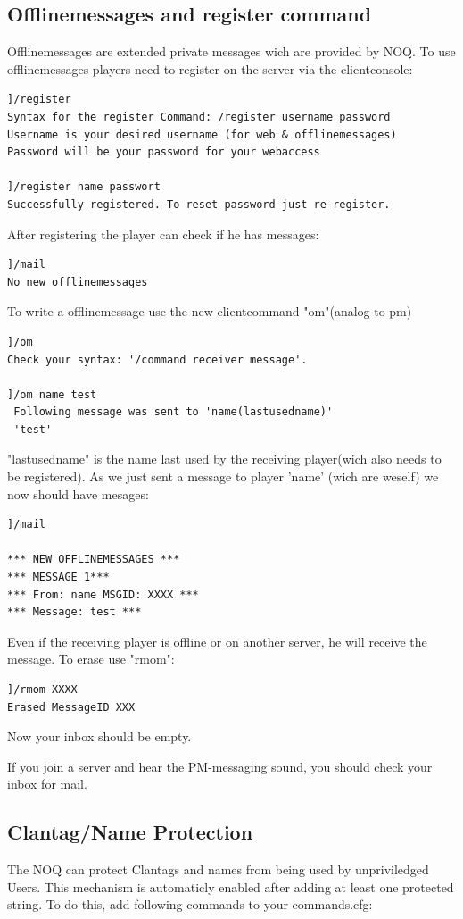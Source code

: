 \documentclass[12pt,a4paper]{article}
\begin{document}
\subsection{Offlinemessages and register command}
Offlinemessages are extended private messages wich are provided by NOQ.
To use offlinemessages players need to register on the server via the clientconsole:
\\
\begin{lstlisting}
]/register
Syntax for the register Command: /register username password
Username is your desired username (for web & offlinemessages)
Password will be your password for your webaccess

]/register name passwort
Successfully registered. To reset password just re-register.
\end{lstlisting}
After registering the player can check if he has messages:
\\
\begin{lstlisting}
]/mail
No new offlinemessages
\end{lstlisting}

To write a offlinemessage use the new clientcommand "om"(analog to pm)
\begin{lstlisting}
]/om
Check your syntax: '/command receiver message'.

]/om name test
 Following message was sent to 'name(lastusedname)'
 'test'
\end{lstlisting}
"lastusedname" is the name last used by the receiving player(wich also needs to be registered).
As we just sent a message to player 'name' (wich are weself) we now should have mesages:
\\
\begin{lstlisting}
]/mail

*** NEW OFFLINEMESSAGES ***
*** MESSAGE 1***
*** From: name MSGID: XXXX ***
*** Message: test ***
\end{lstlisting}
Even if the receiving player is offline or on another server, he will receive the message.
To erase use "rmom":
\\
\begin{lstlisting}
]/rmom XXXX
Erased MessageID XXX
\end{lstlisting}
Now your inbox should be empty.

If you join a server and hear the PM-messaging sound, you should check your inbox for mail.


\subsection{Clantag/Name Protection}
The NOQ can protect Clantags and names from being used by unpriviledged Users.
This mechanism is automaticly enabled after adding at least one protected string.
To do this, add following commands to your commands.cfg:
\end{document}
